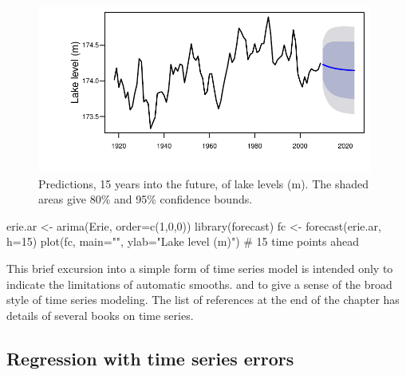 \documentclass{tufte-book}\usepackage[]{graphicx}\usepackage[]{color}
\begin{document}
\begin{figure}
\begin{Schunk}


\centerline{\includegraphics[width=0.98\textwidth]{figs/12-Erie-fcast-1} }

\end{Schunk}
\caption{Predictions, 15 years into the future, of lake levels
  (m). The shaded areas give 80\% and 95\% confidence bounds.
}\label{Erie-fcastplot}
\end{figure}

\begin{marginfigure}[-4.5cm]
\begin{Schunk}
\begin{Sinput}
erie.ar <- arima(Erie,
            order=c(1,0,0))
library(forecast)
fc <- forecast(erie.ar,
               h=15)
plot(fc, main="",
     ylab="Lake level (m)")
  # 15 time points ahead
\end{Sinput}
\end{Schunk}
\end{marginfigure}

This brief excursion into a simple form of time series model is
intended only to indicate the limitations of automatic smooths.  and
to give a sense of the broad style of time series modeling.  The list
of references at the end of the chapter has details of several books
on time series.

\subsection{Regression with time series errors}
\end{document}
